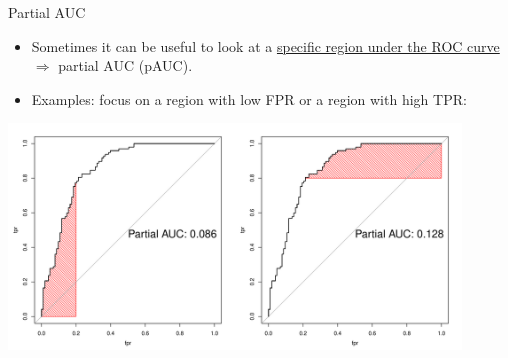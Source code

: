 \documentclass[11pt,compress,t,notes=noshow, xcolor=table]{beamer}
\newenvironment{knitrout}{}{} %
\begin{document}
\begin{vbframe}{Partial AUC}
\begin{itemize}
  \item Sometimes it can be useful to look at a \href{http://journals.sagepub.com/doi/pdf/10.1177/0272989X8900900307}{specific region under the ROC curve}  $\Rightarrow$ partial AUC (pAUC).
  \item Examples: focus on a region with low FPR or a region with high TPR:
\end{itemize}

\begin{knitrout}\scriptsize
{}\color{fgcolor}

{\centering \includegraphics[width=0.9\textwidth]{figure/eval_mclass_roc_sp_13} 

}



\end{knitrout}

\end{vbframe}
\end{document}
